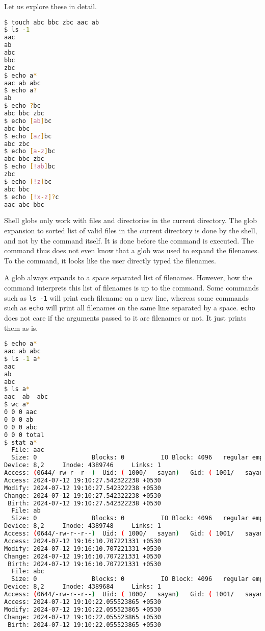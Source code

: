 Let us explore these in detail.


\begin{lstlisting}[language=bash]
$ touch abc bbc zbc aac ab
$ ls -1
aac
ab
abc
bbc
zbc
$ echo a*
aac ab abc
$ echo a?
ab
$ echo ?bc
abc bbc zbc
$ echo [ab]bc
abc bbc
$ echo [az]bc
abc zbc
$ echo [a-z]bc
abc bbc zbc
$ echo [!ab]bc
zbc
$ echo [!z]bc
abc bbc
$ echo [!x-z]?c
aac abc bbc
\end{lstlisting}

Shell globs only work with files and directories in the current directory.
The glob expansion to sorted list of valid files in the current directory
is done by the shell, and not by the command itself. It is done before the
command is executed. The command thus does not even know that a glob was
used to expand the filenames. To the command, it looks like the user
directly typed the filenames.

A glob always expands to a space separated list of filenames. However, how
the command interprets this list of filenames is up to the command. Some
commands such as \lstinline|ls -1| will print each filename on a new line,
whereas some commands such as \lstinline|echo| will print all filenames on
the same line separated by a space. \lstinline|echo| does not care if the
arguments passed to it are filenames or not. It just prints them as is.

\begin{lstlisting}[language=bash]
$ echo a*
aac ab abc
$ ls -1 a*
aac
ab
abc
$ ls a*
aac  ab  abc
$ wc a*
0 0 0 aac
0 0 0 ab
0 0 0 abc
0 0 0 total
$ stat a*
  File: aac
  Size: 0               Blocks: 0          IO Block: 4096   regular empty file
Device: 8,2     Inode: 4389746     Links: 1
Access: (0644/-rw-r--r--)  Uid: ( 1000/   sayan)   Gid: ( 1001/   sayan)
Access: 2024-07-12 19:10:27.542322238 +0530
Modify: 2024-07-12 19:10:27.542322238 +0530
Change: 2024-07-12 19:10:27.542322238 +0530
 Birth: 2024-07-12 19:10:27.542322238 +0530
  File: ab
  Size: 0               Blocks: 0          IO Block: 4096   regular empty file
Device: 8,2     Inode: 4389748     Links: 1
Access: (0644/-rw-r--r--)  Uid: ( 1000/   sayan)   Gid: ( 1001/   sayan)
Access: 2024-07-12 19:16:10.707221331 +0530
Modify: 2024-07-12 19:16:10.707221331 +0530
Change: 2024-07-12 19:16:10.707221331 +0530
 Birth: 2024-07-12 19:16:10.707221331 +0530
  File: abc
  Size: 0               Blocks: 0          IO Block: 4096   regular empty file
Device: 8,2     Inode: 4389684     Links: 1
Access: (0644/-rw-r--r--)  Uid: ( 1000/   sayan)   Gid: ( 1001/   sayan)
Access: 2024-07-12 19:10:22.055523865 +0530
Modify: 2024-07-12 19:10:22.055523865 +0530
Change: 2024-07-12 19:10:22.055523865 +0530
 Birth: 2024-07-12 19:10:22.055523865 +0530
\end{lstlisting}

